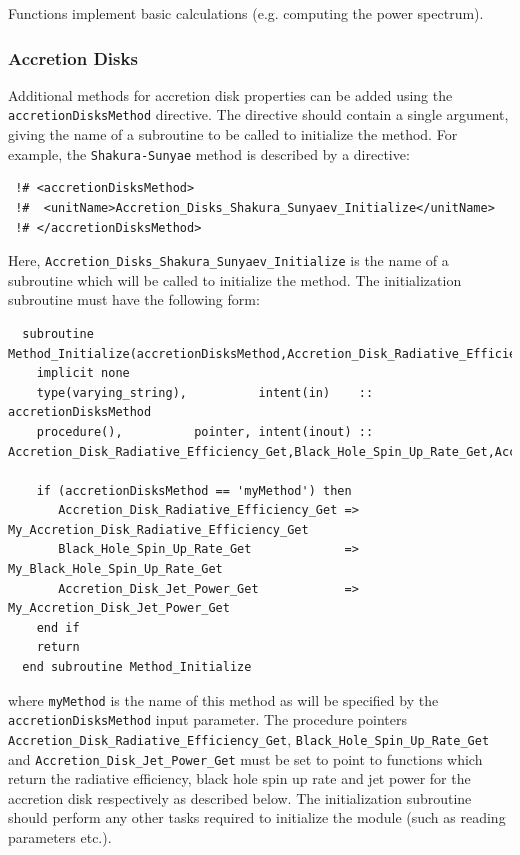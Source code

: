 Functions implement basic calculations (e.g. computing the power spectrum).

\subsubsection{Accretion Disks}\label{sec:AccretionDisks}

Additional methods for accretion disk properties can be added using the {\tt accretionDisksMethod} directive. The directive should contain a single argument, giving the name of a subroutine to be called to initialize the method. For example, the {\tt Shakura-Sunyae} method is described by a directive:
\begin{verbatim}
 !# <accretionDisksMethod>
 !#  <unitName>Accretion_Disks_Shakura_Sunyaev_Initialize</unitName>
 !# </accretionDisksMethod>
\end{verbatim}
Here, {\tt Accretion\_Disks\_Shakura\_Sunyaev\_Initialize} is the name of a subroutine which will be called to initialize the method. The initialization subroutine must have the following form:
\begin{verbatim}
  subroutine Method_Initialize(accretionDisksMethod,Accretion_Disk_Radiative_Efficiency_Get,Black_Hole_Spin_Up_Rate_Get,Accretion_Disk_Jet_Power_Get)
    implicit none
    type(varying_string),          intent(in)    :: accretionDisksMethod
    procedure(),          pointer, intent(inout) :: Accretion_Disk_Radiative_Efficiency_Get,Black_Hole_Spin_Up_Rate_Get,Accretion_Disk_Jet_Power_Get
    
    if (accretionDisksMethod == 'myMethod') then
       Accretion_Disk_Radiative_Efficiency_Get => My_Accretion_Disk_Radiative_Efficiency_Get
       Black_Hole_Spin_Up_Rate_Get             => My_Black_Hole_Spin_Up_Rate_Get
       Accretion_Disk_Jet_Power_Get            => My_Accretion_Disk_Jet_Power_Get
    end if
    return
  end subroutine Method_Initialize
\end{verbatim}
where {\tt myMethod} is the name of this method as will be specified by the {\tt accretionDisksMethod} input parameter. The procedure pointers {\tt Accretion\_Disk\_Radiative\_Efficiency\_Get}, {\tt Black\_Hole\_Spin\_Up\_Rate\_Get} and {\tt Accretion\_Disk\_Jet\_Power\_Get} must be set to point to functions which return the radiative efficiency, black hole spin up rate and jet power for the accretion disk respectively as described below. The initialization subroutine should perform any other tasks required to initialize the module (such as reading parameters etc.).

